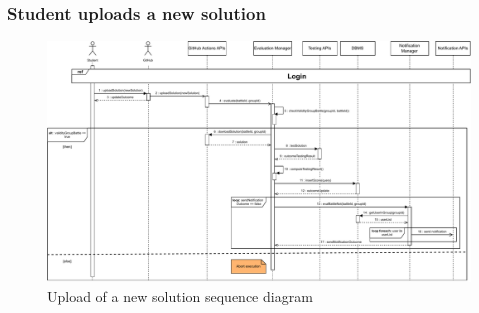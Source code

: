 \documentclass{article}
\begin{document}
{    \subsubsection{Student uploads a new solution}
        \begin{figure}[H]
            \centering
            \hspace*{-3.4cm}\includegraphics[scale=0.62]{Sequence/Sequence11DD.pdf}
            \caption{Upload of a new solution sequence diagram}
            \label{fig:Sequence11DD}
        \end{figure}


}
\end{document}
